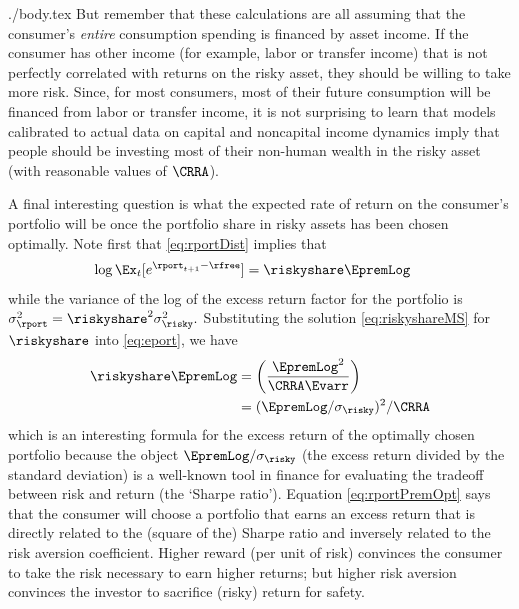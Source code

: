 \documentclass{handout}
\begin{document}
\begin{verbatimwrite}{./body.tex}
But remember that these calculations are all assuming that the consumer's \textit{entire} consumption spending is financed by asset income.  If the consumer has other income (for example, labor or transfer income) that is not perfectly correlated with returns on the risky asset, they should be willing to take more risk.  Since, for most consumers, most of their future consumption will be financed from labor or transfer income, it is not surprising to learn that models calibrated to actual data on capital and noncapital income dynamics imply that people should be investing most of their non-human wealth in the risky asset (with reasonable values of $\CRRA$).




A final interesting question is what the expected rate of return on
the consumer's portfolio will be once the portfolio share in risky
assets has been chosen optimally.  Note first that \eqref{eq:rportDist}
implies that 
\begin{equation}\begin{gathered}\begin{aligned}
  \log \Ex_{t}[e^{\rport_{t+1}-\rfree}] & =  \riskyshare \EpremLog  \label{eq:eport}
\end{aligned}\end{gathered}\end{equation}
while the variance of the log of the excess return factor for the portfolio is $\sigma^{2}_{\rport} = \riskyshare^{2} \sigma^{2}_{\risky}.$  Substituting the solution \eqref{eq:riskyshareMS} for $\riskyshare$ into \eqref{eq:eport}, we have
\begin{equation}\begin{gathered}\begin{aligned}
  \riskyshare \EpremLog & =  \left(\frac{\EpremLog^{2}}{\CRRA \Evarr}\right)  \notag
\\ & =   (\EpremLog/\sigma_{\risky})^{2}/\CRRA \label{eq:rportPremOpt}
\end{aligned}\end{gathered}\end{equation}
which is an interesting formula for the excess return of the optimally
chosen portfolio because the object $\EpremLog/\sigma_{\risky}$ (the
excess return divided by the standard deviation) is a well-known tool
in finance for evaluating the tradeoff between risk and return (the
`Sharpe ratio').  Equation \eqref{eq:rportPremOpt} says that the consumer will
choose a portfolio that earns an excess return that is directly
related to the (square of the) Sharpe ratio and inversely related to the risk aversion
coefficient.  Higher reward (per unit of risk) convinces the consumer
to take the risk necessary to earn higher returns; but higher risk
aversion convinces the investor to sacrifice (risky) return for safety.


\end{verbatimwrite}
\end{document}
